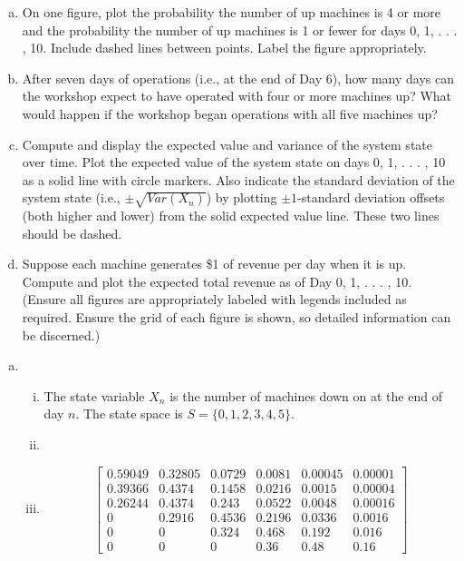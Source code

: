 \documentclass[answers]{exam}
\begin{document}
\begin{questions}
\begin{enumerate}[(a)]
	\item On one figure, plot the probability the number of up machines is 4 or more and the probability the number of up machines is 1 or fewer for days 0, 1, . . . , 10. Include dashed lines between points. Label the figure appropriately.
	
	\item After seven days of operations (i.e., at the end of Day 6), how many days can the workshop expect to have operated with four or more machines up? What would happen if the workshop began operations with all five machines up?
	
	\item Compute and display the expected value and variance of the system state over time. Plot the expected value of the system state on days 0, 1, . . . , 10 as a solid line with circle markers. Also indicate the standard deviation of the system state (i.e., \(\pm \sqrt{Var(X_n)}\)) by plotting \(\pm 1\)-standard deviation offsets (both higher and lower) from the solid expected value line. These two lines should be dashed.
	
	\item Suppose each machine generates \$1 of revenue per day when it is up. Compute and plot the expected total revenue as of Day 0, 1, . . . , 10.
	(Ensure all figures are appropriately labeled with legends included as required. Ensure the grid of each figure is shown, so detailed information can be discerned.)

\end{enumerate}
\begin{solution}
	\begin{enumerate}[(a)]
		\item 
		\begin{enumerate}[i.]
			\item 
			The state variable \(X_n\) is the number of machines down on at the end of day \(n\).
			The state space is \(S=\{0,1,2,3,4,5\}\).
			
			\item 
			
			\item 
			\[\begin{bmatrix}
				0.59049 & 0.32805 & 0.0729 & 0.0081 & 0.00045 & 0.00001 \\
				0.39366 & 0.4374  & 0.1458 & 0.0216 & 0.0015  & 0.00004 \\
				0.26244 & 0.4374  & 0.243  & 0.0522 & 0.0048  & 0.00016 \\
				0       & 0.2916  & 0.4536 & 0.2196 & 0.0336  & 0.0016  \\
				0       & 0       & 0.324  & 0.468  & 0.192   & 0.016   \\
				0       & 0       & 0      & 0.36   & 0.48    & 0.16    
			\end{bmatrix}\]
		

\end{enumerate}
\end{enumerate}
\end{solution}
\end{questions}
\end{document}
